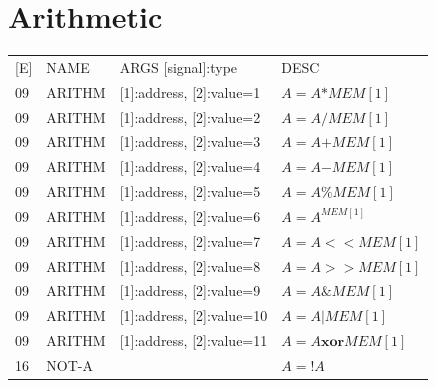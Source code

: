 \documentclass{scrreprt}
\begin{document}
	\section{Arithmetic}
	\begin{tabular}{l | l | l  l}
		[E] & NAME & ARGS [signal]:type & DESC \\
		09 & ARITHM & [1]:address, [2]:value=1 & $A = A \mathbf{*} MEM[1]$\\  
		09 & ARITHM & [1]:address, [2]:value=2 & $A = A \mathbf{/} MEM[1]$\\  
		09 & ARITHM & [1]:address, [2]:value=3 & $A = A \mathbf{+} MEM[1]$\\  
		09 & ARITHM & [1]:address, [2]:value=4 & $A = A \mathbf{-} MEM[1]$\\  
		09 & ARITHM & [1]:address, [2]:value=5 & $A = A \mathbf{\%} MEM[1]$\\  
		09 & ARITHM & [1]:address, [2]:value=6 & $A = A^{MEM[1]}$\\  
		09 & ARITHM & [1]:address, [2]:value=7 & $A = A \mathbf{<<} MEM[1]$\\  
		09 & ARITHM & [1]:address, [2]:value=8 & $A = A \mathbf{>>} MEM[1]$\\  
		09 & ARITHM & [1]:address, [2]:value=9 & $A = A \mathbf{\&} MEM[1]$\\  
		09 & ARITHM & [1]:address, [2]:value=10 & $A = A \mathbf{|} MEM[1]$\\  
		09 & ARITHM & [1]:address, [2]:value=11 & $A = A \mathbf{xor} MEM[1]$\\  
		16 & NOT-A & & $A = !A$\\ 
	\end{tabular}
	
\end{document}

